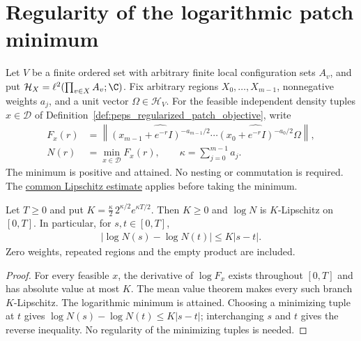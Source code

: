 \section{Regularity of the logarithmic patch minimum}
\label{sec:peps_patch_log_minimum_regularity}

Let $V$ be a finite ordered set with arbitrary finite local configuration
sets $A_v$, and put $\mathcal H_X=\ell^2(\prod_{v\in X}A_v;\C)$.
Fix arbitrary regions $X_0,\ldots,X_{m-1}$, nonnegative weights $a_j$,
and a unit vector $\Omega\in\mathcal H_V$.
For the feasible independent density tuples $x\in\mathcal D$ of
Definition~\ref{def:peps_regularized_patch_objective}, write
\begin{align*}
    F_x(r) & =\left\|
    \widehat{(x_{m-1}+e^{-r}I)^{-a_{m-1}/2}}\cdots
    \widehat{(x_0+e^{-r}I)^{-a_0/2}}\Omega\right\|, \\
    N(r)   & =\min_{x\in\mathcal D}F_x(r),
    \qquad \kappa=\sum_{j=0}^{m-1}a_j.
\end{align*}
The minimum is positive and attained. No nesting or commutation is required.
The \href{https://github.com/openai/math/blob/adc7f1241b42e322a6451854ab7e4b4c146bf78a/preprints/Polynomial-PEPS-approximation-of-gapped-square-grid-ground-states-September-24-2026/build/sections/03-patches.tex\#L433-L451}{common Lipschitz estimate}
applies before taking the minimum.

\begin{lemma}
    \label{thm:peps_patch_log_minimum_lipschitz}
    \leanok
    Let $T\ge0$ and put
    $K=\frac{\kappa}{2}\,2^{\kappa/2}e^{\kappa T/2}$.
    Then $K\ge0$ and $\log N$ is $K$-Lipschitz on $[0,T]$.
    In particular, for $s,t\in[0,T]$,
    \begin{align*}
        |\log N(s)-\log N(t)|\le K|s-t|.
    \end{align*}
    Zero weights, repeated regions and the empty product are included.
\end{lemma}
\begin{proof}\leanok
    For every feasible $x$, the derivative of $\log F_x$ exists throughout
    $[0,T]$ and has absolute value at most $K$.
    The mean value theorem makes every such branch $K$-Lipschitz.
    The logarithmic minimum is attained. Choosing a minimizing tuple at $t$
    gives $\log N(s)-\log N(t)\le K|s-t|$; interchanging $s$ and $t$
    gives the reverse inequality. No regularity of the minimizing tuples
    is needed.
\end{proof}

